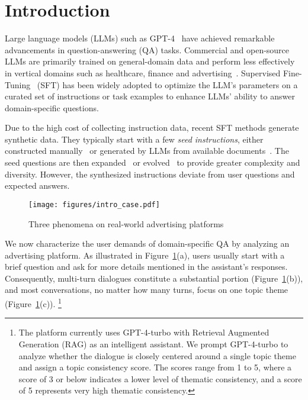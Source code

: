 \section{Introduction}
\label{sec:intro}
Large language models (LLMs) such as GPT-4~\cite{OpenAI:2023ktj} have achieved remarkable advancements in question-answering (QA) tasks. Commercial and open-source LLMs are primarily trained on general-domain data and perform less effectively in vertical domains such as healthcare, finance and advertising~\cite{goyal2024healai,xu2024mental,wu2023bloomberggpt}. Supervised Fine-Tuning~\cite{sanh2022multitask,wang2024instruct,Wang2022SelfInstructAL} (SFT) has been widely adopted to optimize the LLM's parameters on a curated set of instructions or task examples to enhance LLMs' ability to answer domain-specific questions. 

Due to the high cost of collecting instruction data, recent SFT methods generate synthetic data. They typically start with a few \textit{seed instructions}, either constructed manually~\cite{ouyang2022training} or generated by LLMs from available documents~\cite{wang2024instruct}. The seed questions are then expanded~\cite{Wang2022SelfInstructAL} or evolved~\cite{Xu2023WizardLMEL} to provide greater complexity and diversity. However, the synthesized instructions deviate from user questions and expected answers.

\begin{figure}[!t]
\centering
\texttt{[image: figures/intro\_case.pdf]} %
\caption{Three phenomena on real-world advertising platforms}
\label{fig:discoverys}
\end{figure}

We now characterize the user demands of domain-specific QA by analyzing an advertising platform. As illustrated in Figure~\ref{fig:discoverys}(a), users usually start with a brief question and ask for more details mentioned in the assistant's responses. Consequently, multi-turn dialogues constitute a substantial portion (Figure~\ref{fig:discoverys}(b)), and most conversations, no matter how many turns, focus on one topic theme  (Figure~\ref{fig:discoverys}(c)). \footnote{The platform currently uses GPT-4-turbo with Retrieval Augmented Generation (RAG) as an intelligent assistant. We prompt GPT-4-turbo to analyze whether the dialogue is closely centered around a single topic theme and assign a topic consistency score. The scores range from 1 to 5, where a score of 3 or below indicates a lower level of thematic consistency, and a score of 5 represents very high thematic consistency.}  

